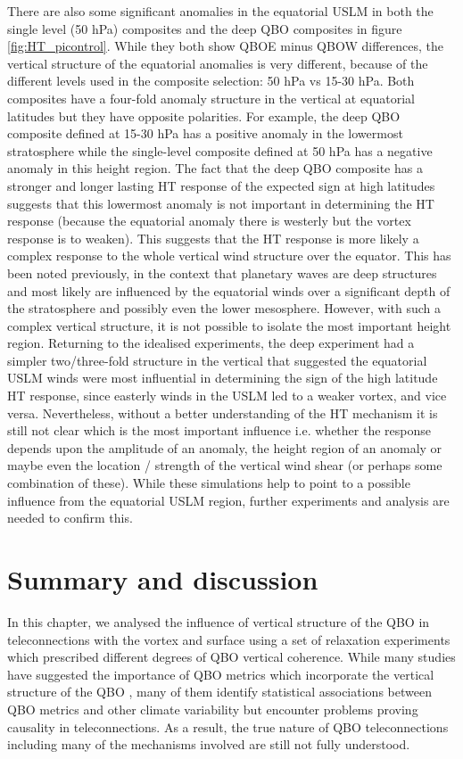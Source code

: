 There are also some significant anomalies in the equatorial USLM in both the single level (50 hPa) composites and the deep QBO composites in figure \ref{fig:HT_picontrol}. While they both show QBOE minus QBOW differences, the vertical structure of the equatorial anomalies is very different, because of the different levels used in the composite selection: 50 hPa vs 15-30 hPa. Both composites have a four-fold anomaly structure in the vertical at equatorial latitudes but they have opposite polarities. For example, the deep QBO composite defined at 15-30 hPa has a positive anomaly in the lowermost stratosphere while the single-level composite defined at 50 hPa has a negative anomaly in this height region. The fact that the deep QBO composite has a stronger and longer lasting HT response of the expected sign at high latitudes suggests that this lowermost anomaly is not important in determining the HT response (because the equatorial anomaly there is westerly but the vortex response is to weaken). This suggests that the HT response is more likely a complex response to the whole vertical wind structure over the equator. This has been noted previously, in the context that planetary waves are deep structures and most likely are influenced by the equatorial winds over a significant depth of the stratosphere and possibly even the lower mesosphere. However, with such a complex vertical structure, it is not possible to isolate the most important height region. Returning to the idealised experiments, the deep experiment had a simpler two/three-fold structure in the vertical that suggested the equatorial USLM winds were most influential in determining the sign of the high latitude HT response, since easterly winds in the USLM led to a weaker vortex, and vice versa. Nevertheless, without a better understanding of the HT mechanism it is still not clear which is the most important influence i.e. whether the response depends upon the amplitude of an anomaly, the height region of an anomaly or maybe even the location / strength of the vertical wind shear (or perhaps some combination of these). While these simulations help to point to a possible influence from the equatorial USLM region, further experiments and analysis are needed to confirm this.

\section{Summary and discussion}
In this chapter, we analysed the influence of vertical structure of the QBO in teleconnections with the vortex and surface using a set of relaxation experiments which prescribed different degrees of QBO vertical coherence. While many studies have suggested the importance of QBO metrics which incorporate the vertical structure of the QBO \citep{schenzingerDefining2017, graySurface2018b, andrewsObserved2019d}, many of them identify statistical associations between QBO metrics and other climate variability but encounter problems proving causality in teleconnections. As a result, the true nature of QBO teleconnections including many of the mechanisms involved are still not fully understood. 

